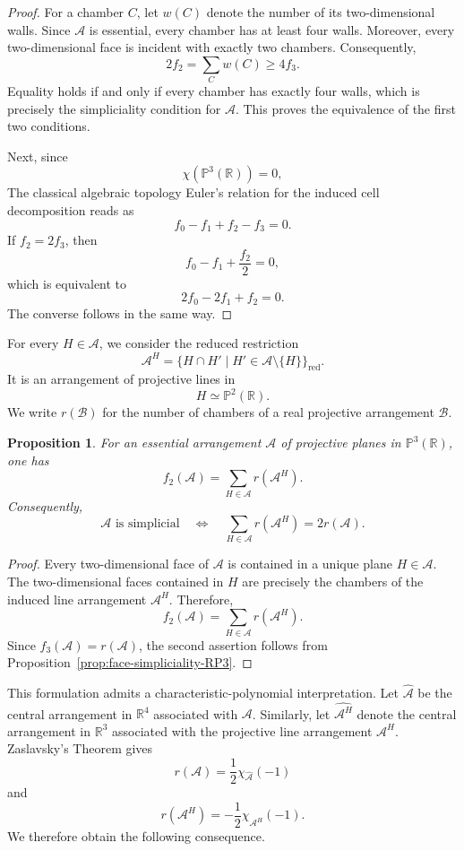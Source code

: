 \documentclass[11pt]{article}
\newtheorem{proposition}[theorem]{Proposition}
\theoremstyle{definition}
\theoremstyle{remark}
\newcommand{\PP}{\mathbb P}
\newcommand{\RR}{\mathbb R}
\newcommand{\cA}{\mathcal A}
\newcommand{\cB}{\mathcal B}
\begin{document}
\begin{proof}
For a chamber $C$, let $w(C)$ denote the number of its two-dimensional
walls. Since $\cA$ is essential, every chamber has at least four
walls. Moreover, every two-dimensional face is incident with exactly
two chambers. Consequently,
\[
2f_2=\sum_C w(C)\geq 4f_3.
\]
Equality holds if and only if every chamber has exactly four walls,
which is precisely the simpliciality condition for $\cA$. This proves the
equivalence of the first two conditions.

Next, since
\[
\chi(\PP^3(\RR))=0,
\]
The classical algebraic topology Euler's relation for the induced cell decomposition reads as
\[
f_0-f_1+f_2-f_3=0.
\]
If $f_2=2f_3$, then
\[
f_0-f_1+\frac{f_2}{2}=0,
\]
which is equivalent to
\[
2f_0-2f_1+f_2=0.
\]
The converse follows in the same way.
\end{proof}
For every $H\in\cA$, we consider the reduced restriction
\[
\cA^H
=
\{H\cap H'\mid H'\in\cA\setminus\{H\}\}_{\mathrm{red}}.
\]
It is an arrangement of projective lines in
\[
H\simeq \PP^2(\RR).
\]
We write $r(\cB)$ for the number of chambers of a real
projective arrangement $\cB$.

\begin{proposition}
\label{prop:restriction-criterion}
For an essential arrangement $\cA$ of projective planes in
$\PP^3(\RR)$, one has
\[
f_2(\cA)
=
\sum_{H\in\cA}r(\cA^H).
\]
Consequently,
\[
\cA \text{ is simplicial}
\quad\Longleftrightarrow\quad
\sum_{H\in\cA}r(\cA^H)
=
2r(\cA).
\]
\end{proposition}

\begin{proof}
Every two-dimensional face of $\cA$ is contained in a unique
plane $H\in\cA$. The two-dimensional faces contained in $H$ are
precisely the chambers of the induced line arrangement $\cA^H$.
Therefore,
\[
f_2(\cA)
=
\sum_{H\in\cA}r(\cA^H).
\]
Since $f_3(\cA)=r(\cA)$, the second assertion follows
from Proposition~\ref{prop:face-simpliciality-RP3}.
\end{proof}

This formulation admits a characteristic-polynomial interpretation.
Let $\widehat{\cA}$ be the central arrangement in $\RR^4$
associated with $\cA$. Similarly, let
$\widehat{\cA^H}$ denote the central arrangement in $\RR^3$
associated with the projective line arrangement $\cA^H$.
Zaslavsky's Theorem \cite[Theorem A]{zaslavsky} gives
\[
r(\cA)
=
\frac{1}{2}\chi_{\widehat{\cA}}(-1)
\]
and
\[
r(\cA^H)
=
-\frac{1}{2}\chi_{\widehat{\cA^H}}(-1).
\]
We therefore obtain the following consequence.
\end{document}
